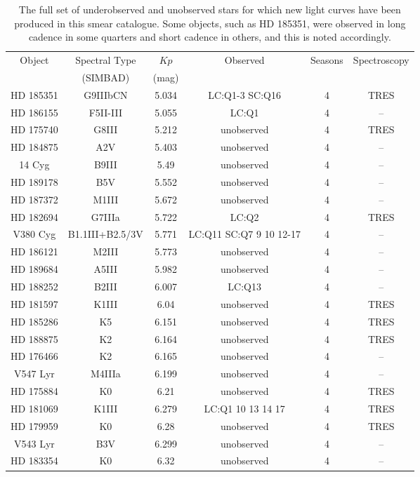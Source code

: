 \begin{table*}
\caption{The full set of underobserved and unobserved stars for which new light curves have been produced in this smear catalogue. Some objects, such as HD 185351, were observed in long cadence in some quarters and short cadence in others, and this is noted accordingly.\label{all_stars}\label{all_stars}}
\begin{tabular}{cccccc}
\hline \hline
Object & Spectral Type & $Kp$ & Observed & Seasons & Spectroscopy \\
 & (SIMBAD) & (mag) &  &  &  \\
\hline
HD 185351 & G9IIIbCN & 5.034 & LC:Q1-3 SC:Q16 & 4 & TRES \\
HD 186155 & F5II-III & 5.055 & LC:Q1 & 4 & -- \\
HD 175740 & G8III & 5.212 & unobserved & 4 & TRES \\
HD 184875 & A2V & 5.403 & unobserved & 4 & -- \\
14 Cyg & B9III & 5.49 & unobserved & 4 & -- \\
HD 189178 & B5V & 5.552 & unobserved & 4 & -- \\
HD 187372 & M1III & 5.672 & unobserved & 4 & -- \\
HD 182694 & G7IIIa & 5.722 & LC:Q2 & 4 & TRES \\
V380 Cyg & B1.1III+B2.5/3V & 5.771 & LC:Q11 SC:Q7 9 10 12-17 & 4 & -- \\
HD 186121 & M2III & 5.773 & unobserved & 4 & -- \\
HD 189684 & A5III & 5.982 & unobserved & 4 & -- \\
HD 188252 & B2III & 6.007 & LC:Q13 & 4 & -- \\
HD 181597 & K1III & 6.04 & unobserved & 4 & TRES \\
HD 185286 & K5 & 6.151 & unobserved & 4 & TRES \\
HD 188875 & K2 & 6.164 & unobserved & 4 & TRES \\
HD 176466 & K2 & 6.165 & unobserved & 4 & -- \\
V547 Lyr & M4IIIa & 6.199 & unobserved & 4 & -- \\
HD 175884 & K0 & 6.21 & unobserved & 4 & TRES \\
HD 181069 & K1III & 6.279 & LC:Q1 10 13 14 17 & 4 & TRES \\
HD 179959 & K0 & 6.28 & unobserved & 4 & TRES \\
V543 Lyr & B3V & 6.299 & unobserved & 4 & -- \\
HD 183354 & K0 & 6.32 & unobserved & 4 & -- \\

\end{tabular}
\end{table*}
